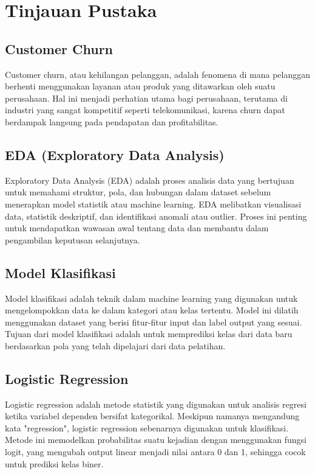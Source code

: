 \newpage
\section{Tinjauan Pustaka}

\subsection{Customer Churn}
Customer churn, atau kehilangan pelanggan, adalah fenomena di mana pelanggan berhenti menggunakan layanan atau produk yang ditawarkan oleh suatu perusahaan. Hal ini menjadi perhatian utama bagi perusahaan, terutama di industri yang sangat kompetitif seperti telekomunikasi, karena churn dapat berdampak langsung pada pendapatan dan profitabilitas.

\subsection{EDA (Exploratory Data Analysis)}
Exploratory Data Analysis (EDA) adalah proses analisis data yang bertujuan untuk memahami struktur, pola, dan hubungan dalam dataset sebelum menerapkan model statistik atau machine learning. EDA melibatkan visualisasi data, statistik deskriptif, dan identifikasi anomali atau outlier. Proses ini penting untuk mendapatkan wawasan awal tentang data dan membantu dalam pengambilan keputusan selanjutnya.

\subsection{Model Klasifikasi}
Model klasifikasi adalah teknik dalam machine learning yang digunakan untuk mengelompokkan data ke dalam kategori atau kelas tertentu. Model ini dilatih menggunakan dataset yang berisi fitur-fitur input dan label output yang sesuai. Tujuan dari model klasifikasi adalah untuk memprediksi kelas dari data baru berdasarkan pola yang telah dipelajari dari data pelatihan.

\subsection{Logistic Regression}
Logistic regression adalah metode statistik yang digunakan untuk analisis regresi ketika variabel dependen bersifat kategorikal. Meskipun namanya mengandung kata "regression", logistic regression sebenarnya digunakan untuk klasifikasi. Metode ini memodelkan probabilitas suatu kejadian dengan menggunakan fungsi logit, yang mengubah output linear menjadi nilai antara 0 dan 1, sehingga cocok untuk prediksi kelas biner.

